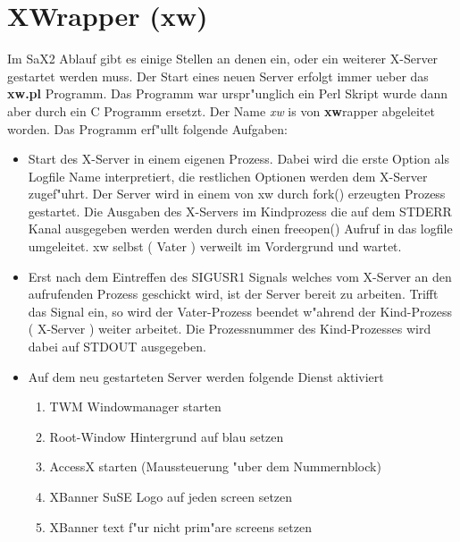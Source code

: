 \section{XWrapper (xw)}
\label{sec:xw}
Im SaX2 Ablauf gibt es einige Stellen an denen ein, oder ein 
weiterer X-Server gestartet werden muss. Der Start eines neuen 
Server erfolgt immer ueber das \textbf{xw.pl} Programm.
Das Programm war urspr"unglich ein Perl Skript wurde dann aber
durch ein C Programm ersetzt. Der Name \textit{xw} is von \textbf{xw}rapper
abgeleitet worden. Das Programm erf"ullt folgende Aufgaben:
\begin{itemize}
\item Start des X-Server in einem eigenen Prozess. Dabei wird die erste
      Option als Logfile Name interpretiert, die restlichen Optionen 
      werden dem X-Server zugef"uhrt. Der Server wird in einem von
      xw durch fork() erzeugten Prozess gestartet. Die Ausgaben des
      X-Servers im Kindprozess die auf dem STDERR Kanal ausgegeben werden 
      werden durch einen freeopen() Aufruf in das logfile umgeleitet.
      xw selbst ( Vater ) verweilt im Vordergrund und wartet.
\item Erst nach dem Eintreffen des SIGUSR1 Signals welches vom X-Server
      an den aufrufenden Prozess geschickt wird, ist der Server bereit
      zu arbeiten. Trifft das Signal ein, so wird der Vater-Prozess 
      beendet w"ahrend der Kind-Prozess ( X-Server ) weiter arbeitet.
      Die Prozessnummer des Kind-Prozesses wird dabei auf STDOUT
      ausgegeben.
\item Auf dem neu gestarteten Server werden folgende Dienst aktiviert
      \begin{enumerate}
      \item TWM Windowmanager starten
      \item Root-Window Hintergrund auf blau setzen
      \item AccessX starten (Maussteuerung "uber dem Nummernblock)
      \item XBanner SuSE Logo auf jeden screen setzen
      \item XBanner text f"ur nicht prim"are screens setzen
      \end{enumerate}
\end{itemize}

